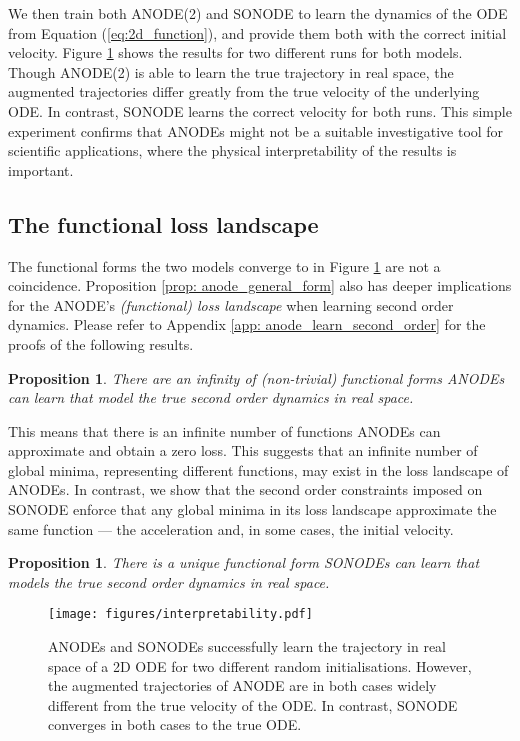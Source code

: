 \documentclass{article}
\newtheorem{proposition}[theorem]{Proposition}
\theoremstyle{remark}
\theoremstyle{definition}
\begin{document}
We then train both ANODE(2) and SONODE to learn the dynamics of the ODE from Equation (\ref{eq:2d_function}), and provide them both with the correct initial velocity. Figure \ref{fig: interpretability} shows the results for two different runs for both models. Though ANODE(2) is able to learn the true trajectory in real space, the augmented trajectories differ greatly from the true velocity of the underlying ODE. In contrast, SONODE learns the correct velocity for both runs. This simple experiment confirms that ANODEs might not be a suitable investigative tool for scientific applications, where the physical interpretability of the results is important.

\subsection{The functional loss landscape}
The functional forms the two models converge to in  Figure \ref{fig: interpretability} are not a coincidence. Proposition \ref{prop: anode_general_form} also has deeper implications for the ANODE's \textit{(functional) loss landscape} when learning second order dynamics. Please refer to Appendix \ref{app: anode_learn_second_order} for the proofs of the following results.  

\begin{proposition}
\label{prop: anode_infinity}
There are an infinity of (non-trivial) functional forms ANODEs can learn that model the true second order dynamics in real space.
\end{proposition}

This means that there is an infinite number of functions ANODEs can approximate and obtain a zero loss. This suggests that an infinite number of global minima, representing different functions, may exist in the loss landscape of ANODEs. In contrast, we show that the second order constraints imposed on SONODE enforce that any global minima in its loss landscape approximate the same function --- the acceleration and, in some cases, the initial velocity. 

\begin{proposition}
\label{prop: sonode_unique}
There is a unique functional form SONODEs can learn that models the true second order dynamics in real space.
\end{proposition}

\begin{figure}
\centering
    \texttt{[image: figures/interpretability.pdf]}
    \vspace{-8pt}
    \caption{ANODEs and SONODEs successfully learn the trajectory in real space of a 2D ODE for two different random initialisations. However, the augmented trajectories of ANODE are in both cases widely different from the true velocity of the ODE. In contrast, SONODE converges in both cases to the true ODE.}
    \vspace{-10pt}
    \label{fig: interpretability}
\end{figure}
\end{document}
